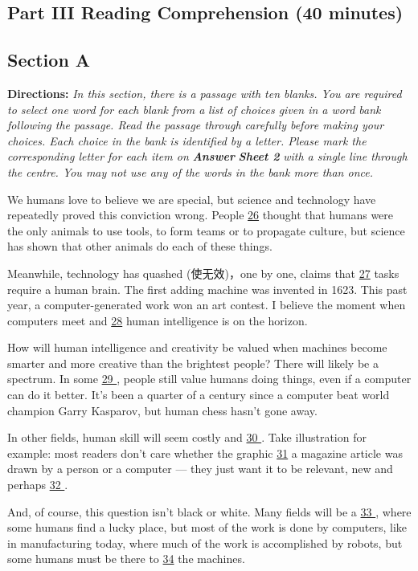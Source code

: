 \documentclass[UTF8,11pt]{ctexart}
\begin{document}
\subsection*{\textbf{Part III Reading Comprehension (40 minutes)}}


\subsection*{\textbf{Section A}}


\textbf{Directions:} \textit{In this section, there is a passage with ten blanks. You are required to select one word for each blank from a} \textit{list of choices given in a word bank following the passage. Read the passage through carefully before making your} \textit{choices. Each choice in the bank is identified by a letter. Please mark the corresponding letter for each item on }\textbf{\textit{Answer}} \textbf{\textit{Sheet 2}}\textit{ with a single line through the centre. You may not use any of the words in the bank more than once.}


We humans love to believe we are special, but science and technology have repeatedly proved this conviction wrong. People \uline{26} thought that humans were the only animals to use tools, to form teams or to propagate culture, but science has shown that other animals do each of these things.


Meanwhile, technology has quashed (使无效)，one by one, claims that \uline{27} tasks require a human brain. The first adding machine was invented in 1623. This past year, a computer-generated work won an art contest. I believe the moment when computers meet and \uline{28} human intelligence is on the horizon.


How will human intelligence and creativity be valued when machines become smarter and more creative than the brightest people? There will likely be a spectrum. In some \uline{29 }, people still value humans doing things, even if a computer can do it better. It’s been a quarter of a century since a computer beat world champion Garry Kasparov, but human chess hasn’t gone away.


In other fields, human skill will seem costly and \uline{30 }. Take illustration for example: most readers don’t care whether the graphic \uline{31} a magazine article was drawn by a person or a computer — they just want it to be relevant, new and perhaps \uline{32 }.


And, of course, this question isn’t black or white. Many fields will be a \uline{33 }, where some humans find a lucky place, but most of the work is done by computers, like in manufacturing today, where much of the work is accomplished by robots, but some humans must be there to \uline{34} the machines.
\end{document}
